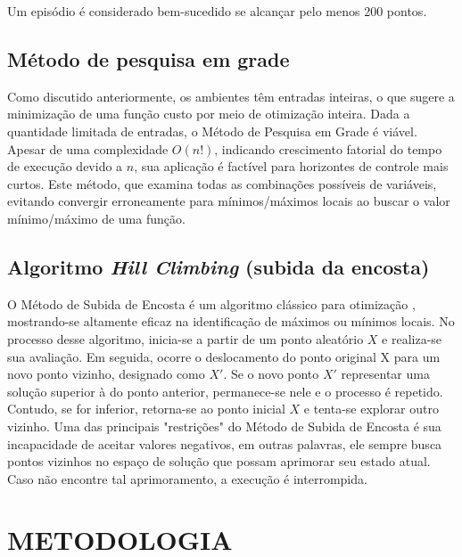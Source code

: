 \documentclass[12pt,           %
a4paper,                       %
openany,                       %
oneside,                       %
chapter=TITLE,                 %
english,                       %
spanish,                       %
brazil,                        %
sumario=tradicional]{abntex2}  %
\begin{document}
\begin{OnehalfSpace}
Um episódio é considerado bem-sucedido se alcançar pelo menos 200 pontos.

\section{Método de pesquisa em grade}
\label{sec:MPG}

Como discutido anteriormente, os ambientes têm entradas inteiras, o que sugere a minimização de uma função custo por meio de otimização inteira. Dada a quantidade limitada de entradas, o Método de Pesquisa em Grade é viável. Apesar de uma complexidade \(O(n!)\), indicando crescimento fatorial do tempo de execução devido a $n$, sua aplicação é factível para horizontes de controle mais curtos. Este método, que examina todas as combinações possíveis de variáveis, evitando convergir erroneamente para mínimos/máximos locais ao buscar o valor mínimo/máximo de uma função.

\section{ Algoritmo \textit{Hill Climbing} (subida da encosta)}
\label{sec:Hill}

O Método de Subida de Encosta é um algoritmo clássico para otimização \cite{hill}, mostrando-se altamente eficaz na identificação de máximos ou mínimos locais. No processo desse algoritmo, inicia-se a partir de um ponto aleatório $X$ e realiza-se sua avaliação. Em seguida, ocorre o deslocamento do ponto original X para um novo ponto vizinho, designado como $X'$. Se o novo ponto $X'$ representar uma solução superior à do ponto anterior, permanece-se nele e o processo é repetido. Contudo, se for inferior, retorna-se ao ponto inicial $X$ e tenta-se explorar outro vizinho. Uma das principais "restrições" do Método de Subida de Encosta é sua incapacidade de aceitar valores negativos, em outras palavras, ele sempre busca pontos vizinhos no espaço de solução que possam aprimorar seu estado atual. Caso não encontre tal aprimoramento, a execução é interrompida.\\
			 
		
{\let\clearpage\relax\par \chapter{METODOLOGIA}}
\label{ch:metodologia}                      %


\end{OnehalfSpace}
\end{document}
